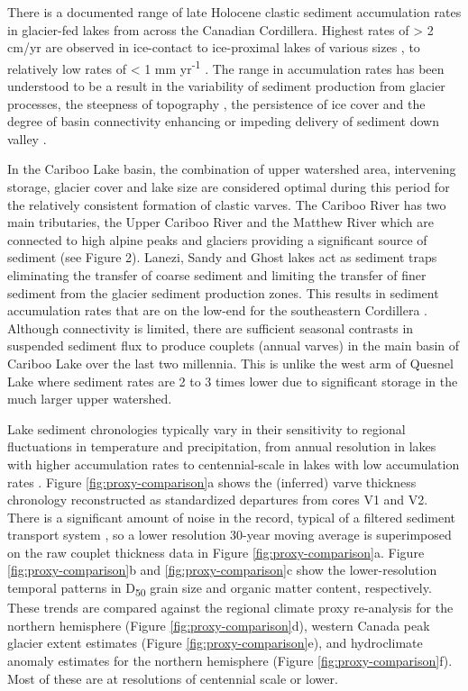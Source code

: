 \documentclass[Royal,times,doublespace,sageh]{sagej}
\begin{document}
There is a documented range of late Holocene clastic sediment
accumulation rates in glacier-fed lakes from across the Canadian
Cordillera. Highest rates of \textgreater{} 2 cm/yr are observed in
ice-contact to ice-proximal lakes of various sizes
\citep{Desloges1994d, Crookshanks2008}, to relatively low rates of
\textless{} 1 mm yr\textsuperscript{-1} \citep{Gilbert2012}. The range
in accumulation rates has been understood to be a result in the
variability of sediment production from glacier processes, the steepness
of topography \citep{Ballantyne2002}, the persistence of ice cover and
the degree of basin connectivity enhancing or impeding delivery of
sediment down valley \citep{Wohl2019}.

In the Cariboo Lake basin, the combination of upper watershed area,
intervening storage, glacier cover and lake size are considered optimal
during this period for the relatively consistent formation of clastic
varves. The Cariboo River has two main tributaries, the Upper Cariboo
River and the Matthew River which are connected to high alpine peaks and
glaciers providing a significant source of sediment (see Figure 2).
Lanezi, Sandy and Ghost lakes act as sediment traps eliminating the
transfer of coarse sediment and limiting the transfer of finer sediment
from the glacier sediment production zones. This results in sediment
accumulation rates that are on the low-end for the southeastern
Cordillera \citep{Hodder2006b}. Although connectivity is limited, there
are sufficient seasonal contrasts in suspended sediment flux to produce
couplets (annual varves) in the main basin of Cariboo Lake over the last
two millennia. This is unlike the west arm of Quesnel Lake where
sediment rates are 2 to 3 times lower due to significant storage in the
much larger upper watershed.

Lake sediment chronologies typically vary in their sensitivity to
regional fluctuations in temperature and precipitation, from annual
resolution in lakes with higher accumulation rates
\citep[e.g.][]{Menounos2008c} to centennial-scale in lakes with low
accumulation rates \citep[e.g.][]{Desloges1999}. Figure
\ref{fig:proxy-comparison}a shows the (inferred) varve thickness
chronology reconstructed as standardized departures from cores V1 and
V2. There is a significant amount of noise in the record, typical of a
filtered sediment transport system \citep[e.g.][]{Jerolmack2010}, so a
lower resolution 30-year moving average is superimposed on the raw
couplet thickness data in Figure \ref{fig:proxy-comparison}a. Figure
\ref{fig:proxy-comparison}b and \ref{fig:proxy-comparison}c show the
lower-resolution temporal patterns in D\textsubscript{50} grain size and
organic matter content, respectively. These trends are compared against
the \citet{Moberg2005} regional climate proxy re-analysis for the
northern hemisphere (Figure \ref{fig:proxy-comparison}d),
\citet{Solomina2016} western Canada peak glacier extent estimates
(Figure \ref{fig:proxy-comparison}e), and \citet{Ljungqvist2016}
hydroclimate anomaly estimates for the northern hemisphere (Figure
\ref{fig:proxy-comparison}f). Most of these are at resolutions of
centennial scale or lower.
\end{document}
